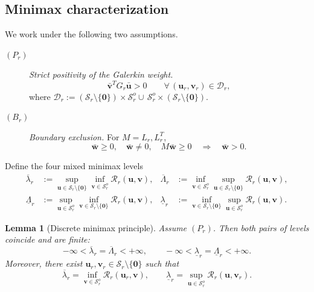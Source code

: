 \documentclass[preprint,10pt]{elsarticle}
\theoremstyle{plain}
\newtheorem{lemma}{Lemma}
\theoremstyle{definition}
\theoremstyle{remark}
\begin{document}
\subsection{Minimax characterization}

We work under the following two assumptions.

\begin{description}
	\item[$(P_r)$] \emph{Strict positivity of the Galerkin weight.}
	\[
	\bar{\mathbf{v}}^T G_r\bar{\mathbf{u}}>0
	\qquad
	\forall\,(\mathbf{u}_r,\mathbf{v}_r)\in\mathcal{D}_r,
	\]
	where $\mathcal{D}_r:=(\mathcal{S}_r\setminus\{\mathbf{0}\})\times\mathcal{S}_r^o
	\cup\,\mathcal{S}_r^o\times(\mathcal{S}_r\setminus\{\mathbf{0}\})$.
	
	\item[$(B_r)$] \emph{Boundary exclusion.} For $M=L_r,L_r^T$,
	\[
	\bar{\mathbf{w}}\ge0,\quad
	\bar{\mathbf{w}}\ne0,\quad
	M\bar{\mathbf{w}}\ge0
	\quad\Longrightarrow\quad
	\bar{\mathbf{w}}>0.
	\]
\end{description}

Define the four mixed minimax levels
\begin{align}
	\overline\lambda_r
	&:= \sup_{\mathbf{u}\in\mathcal{S}_r\setminus\{\mathbf{0}\}}
	\inf_{\mathbf{v}\in\mathcal{S}_r^o}
	\mathcal{R}_r(\mathbf{u},\mathbf{v}),
	&
	\overline\Lambda_r
	&:= \inf_{\mathbf{v}\in\mathcal{S}_r^o}
	\sup_{\mathbf{u}\in\mathcal{S}_r\setminus\{\mathbf{0}\}}
	\mathcal{R}_r(\mathbf{u},\mathbf{v}),
	\label{eq:discrete-upper-minimax}\\
	\underline\Lambda_r
	&:= \sup_{\mathbf{u}\in\mathcal{S}_r^o}
	\inf_{\mathbf{v}\in\mathcal{S}_r\setminus\{\mathbf{0}\}}
	\mathcal{R}_r(\mathbf{u},\mathbf{v}),
	&
	\underline\lambda_r
	&:= \inf_{\mathbf{v}\in\mathcal{S}_r\setminus\{\mathbf{0}\}}
	\sup_{\mathbf{u}\in\mathcal{S}_r^o}
	\mathcal{R}_r(\mathbf{u},\mathbf{v}).
	\label{eq:discrete-lower-minimax}
\end{align}

\begin{lemma}[Discrete minimax principle]\label{lem:discrete-minimax}
	Assume $(P_r)$. Then both pairs of levels coincide and are finite:
	\[
	-\infty < \overline\lambda_r = \overline\Lambda_r < +\infty,
	\qquad
	-\infty < \underline\lambda_r = \underline\Lambda_r < +\infty.
	\]
	Moreover, there exist $\mathbf{u}_r,\mathbf{v}_r\in\mathcal{S}_r\setminus\{\mathbf{0}\}$
	such that
	\begin{equation}\label{eq:minmaxD2}
		\overline\lambda_r
		= \inf_{\mathbf{v}\in\mathcal{S}_r^o}\mathcal{R}_r(\mathbf{u}_r,\mathbf{v}),
		\qquad
		\underline\lambda_r
		= \sup_{\mathbf{u}\in\mathcal{S}_r^o}\mathcal{R}_r(\mathbf{u},\mathbf{v}_r).
	\end{equation}
\end{lemma}
\end{document}
